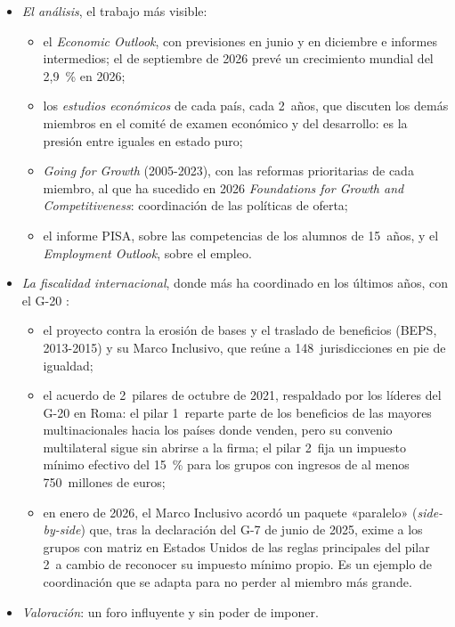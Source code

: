 \documentclass[11pt]{article}
\begin{document}
\begin{itemize}
\begin{itemize}
  \end{itemize}
\item \emph{El análisis}, el trabajo más visible:
  \begin{itemize}
  \item el \emph{Economic Outlook}, con previsiones en junio y en diciembre e informes intermedios; el de septiembre de 2026 prevé un crecimiento mundial del 2,9~\% en 2026\nocite{OCDE2026EOInterim};
  \item los \emph{estudios económicos} de cada país, cada 2~años, que discuten los demás miembros en el comité de examen económico y del desarrollo: es la presión entre iguales en estado puro;
  \item \emph{Going for Growth} (2005-2023), con las reformas prioritarias de cada miembro, al que ha sucedido en 2026 \emph{Foundations for Growth and Competitiveness}\nocite{OCDE2026Foundations}: coordinación de las políticas de oferta;
  \item el informe PISA, sobre las competencias de los alumnos de 15~años, y el \emph{Employment Outlook}, sobre el empleo.
  \end{itemize}
\item \emph{La fiscalidad internacional}, donde más ha coordinado en los últimos años, con el G-20 :
  \begin{itemize}
  \item el proyecto contra la erosión de bases y el traslado de beneficios (BEPS, 2013-2015) y su Marco Inclusivo, que reúne a 148~jurisdicciones en pie de igualdad\nocite{OCDE2025MarcoInclusivo};
  \item el acuerdo de 2~pilares de octubre de 2021, respaldado por los líderes del G-20 en Roma\nocite{G20Roma2021}: el pilar 1~reparte parte de los beneficios de las mayores multinacionales hacia los países donde venden, pero su convenio multilateral sigue sin abrirse a la firma; el pilar 2~fija un impuesto mínimo efectivo del 15~\% para los grupos con ingresos de al menos 750~millones de euros;
  \item en enero de 2026, el Marco Inclusivo acordó un paquete «paralelo» (\emph{side-by-side}) que, tras la declaración del G-7 de junio de 2025, exime a los grupos con matriz en Estados Unidos de las reglas principales del pilar 2~a cambio de reconocer su impuesto mínimo propio\nocite{OCDE2026LadoALado}. Es un ejemplo de coordinación que se adapta para no perder al miembro más grande.
  \end{itemize}
\item \emph{Valoración}: un foro influyente y sin poder de imponer.

\end{itemize}
\end{document}
